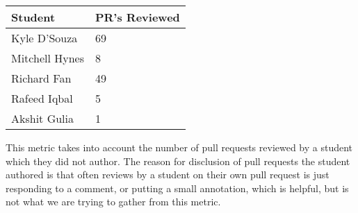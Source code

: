 \documentclass{article}
\begin{document}
\begin{table}[H]
  \centering
  \begin{tabular}{ll}
    \toprule
    \textbf{Student} & \textbf{PR's Reviewed}\\
    \midrule
    Kyle D'Souza & 69\\
    Mitchell Hynes & 8\\
    Richard Fan & 49\\
    Rafeed Iqbal & 5\\
    Akshit Gulia & 1\\
    \bottomrule
  \end{tabular}
\end{table}

This metric takes into account the number of pull requests reviewed by a student which they did not author. The reason for disclusion of pull requests the student authored is that often reviews by a student on their own pull request is just responding to a comment, or putting a small annotation, which is helpful, but is not what we are trying to gather from this metric.
\end{document}
